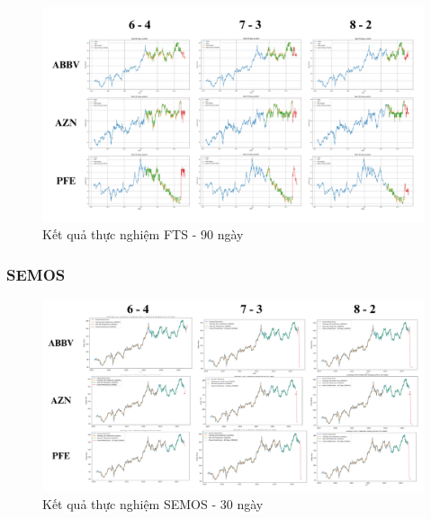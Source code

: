 \documentclass[conference]{IEEEtran}
\begin{document}
\begin{figure}[H]
    \centering
    \begin{minipage}{0.5\textwidth}
    \centering
    \includegraphics[width=1\textwidth]{Image/FTS90.png}
    \caption{Kết quả thực nghiệm FTS - 90 ngày}
    \label{fig:1}
    \end{minipage}
\end{figure}
\subsubsection{SEMOS}
\begin{figure}[H]
    \centering
    \begin{minipage}{0.5\textwidth}
    \centering
    \includegraphics[width=1\textwidth]{Image/SEMOS30.png}
    \caption{Kết quả thực nghiệm SEMOS - 30 ngày}
    \label{fig:1}
    \end{minipage}
\end{figure}
\end{document}
